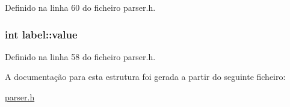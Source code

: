 Definido na linha 60 do ficheiro parser.\-h.

\hypertarget{structlabel_ac0cdaf20932b7fe75988a1d08510b72c}{
\subsubsection[{value}]{\setlength{\rightskip}{0pt plus 5cm}int label\-::value}}\label{structlabel_ac0cdaf20932b7fe75988a1d08510b72c}


Definido na linha 58 do ficheiro parser.\-h.



A documentação para esta estrutura foi gerada a partir do seguinte ficheiro\-:\begin{DoxyCompactItemize}
\item 
\hyperlink{parser_8h}{parser.\-h}\end{DoxyCompactItemize}
